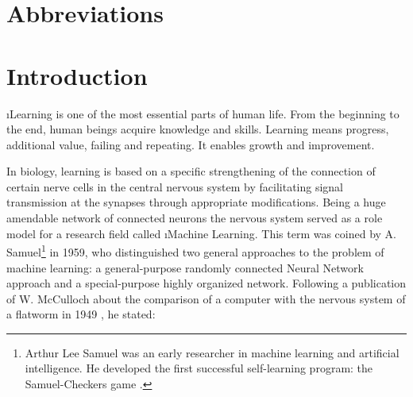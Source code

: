 \listoftables

\chapter*{Abbreviations}\label{s.abbr}
\begin{acronym}[----------------]
\end{acronym}

\chapter{Introduction}\label{c.introduction}

\i{Learning} is one of the most essential parts of human life. From the beginning to the end, human beings acquire knowledge and skills. Learning means progress, additional value, failing and repeating. It enables growth and improvement.

In biology, learning is based on a specific strengthening of the connection of certain nerve cells in the central nervous system by facilitating signal transmission at the synapses through appropriate modifications. Being a huge amendable network of connected neurons the nervous system served as a role model for a research field called \i{Machine Learning}. This term was coined by A. Samuel\footnote{Arthur Lee Samuel was an early researcher in machine learning and artificial intelligence. He developed the first successful self-learning program: the Samuel-Checkers game \cite{samuel1959}.} \cite{samuel1959} in 1959, who distinguished two general approaches to the problem of machine learning: a general-purpose randomly connected Neural Network approach and a special-purpose highly organized network. Following a publication of  W. McCulloch about the comparison of a computer with the nervous system of a flatworm in 1949 \cite{mcculloch1949}, he stated:


